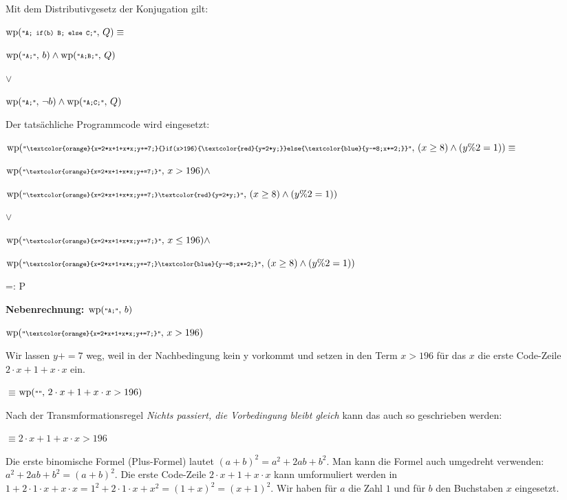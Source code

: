 \documentclass{lehramt-informatik}
\def\MatheEnv#1{
  \medskip

  \hspace{2em}#1

  \medskip
}
\def\Mathe#1{
  \MatheEnv{$#1$}
}
\def\MatheEquiv#1{
  \MatheEnv{$\equiv$\hspace{2em}$#1$}
}
\def\Erklaerung#1{
  \medskip
  {\footnotesize#1}
}
\def\wp#1#2{
  \text{wp}(\texttt{\scriptsize"#1"},\thinspace #2)
}
\begin{document}
\begin{antwort}
\setlength{\parindent}{0pt}

\def\code#1{„\texttt{#1}“}
\def\FarbeA#1{\textcolor{orange}{#1}}
\def\FarbeB#1{\textcolor{red}{#1}}
\def\FarbeC#1{\textcolor{blue}{#1}}

\def\NebenRechnung#1{\medskip\bigskip\par\textbf{Nebenrechnung: #1}\par\medskip}

\def\AnweisungI{x=2*x+1+x*x;}
\def\AnweisungII{y+=7;}
\def\AnweisungIII{y=2*y;}
\def\AnweisungIV{y-=8;}
\def\AnweisungV{x*=2;}

\def\A{\FarbeA{\AnweisungI\AnweisungII}}
\def\B{\FarbeB{\AnweisungIII}}
\def\C{\FarbeC{\AnweisungIV\AnweisungV}}
\def\Q{(x \geq 8) \land (y \% 2 = 1)}

Mit dem Distributivgesetz der Konjugation gilt: \bigskip

$\wp{A; if(b) B; else C;}{Q} \equiv$

$\wp{A;}{b} \land \wp{A;B;}{Q}$

$\lor$%

$\wp{A;}{\neg b} \land \wp{A;C;}{Q}$

\bigskip Der tatsächliche Programmcode wird eingesetzt:\bigskip

$\wp{\A{}if(x>196)\{\B\}else\{\C\}}{\Q} \equiv$

$\wp{\A}{x > 196} \land$

$\wp{\A\B}{\Q}$

%
$\lor$

$\wp{\A}{x \leq 196} \land$

$\wp{\A\C}{\Q}$

=: P

%

\NebenRechnung{$\wp{A;}{b}$}

\Mathe{
  \wp{\A}{x > 196}
}

\Erklaerung{Wir lassen $y+=7$ weg, weil in der Nachbedingung kein y
vorkommt und setzen in den Term $x > 196$ für das $x$ die erste
Code-Zeile $2 \cdot x + 1 + x \cdot x$ ein.}

\MatheEquiv{
  \wp{}{2 \cdot x + 1 + x \cdot x > 196}
}

\Erklaerung{Nach der Transmformationsregel \textit{Nichts passiert, die
Vorbedingung bleibt gleich} kann das auch so geschrieben werden:}

\MatheEquiv{
  2 \cdot x + 1 + x \cdot x > 196
}

\Erklaerung{Die erste binomische Formel (Plus-Formel) lautet
$(a + b)^2 = a^2 + 2ab + b^2$.
Man kann die Formel auch umgedreht verwenden:
$a^2 + 2ab + b^2 = (a + b)^2$.
Die erste Code-Zeile $2 \cdot x + 1 + x \cdot x$
kann umformuliert werden in
$
1 + 2 \cdot 1 \cdot x + x \cdot x =
1^2 + 2 \cdot 1 \cdot x + x^2 =
(1 + x)^2 =
(x + 1)^2
$.
Wir haben für $a$ die Zahl $1$ und für $b$ den Buchstaben $x$
eingesetzt.}


\end{antwort}
\end{document}
